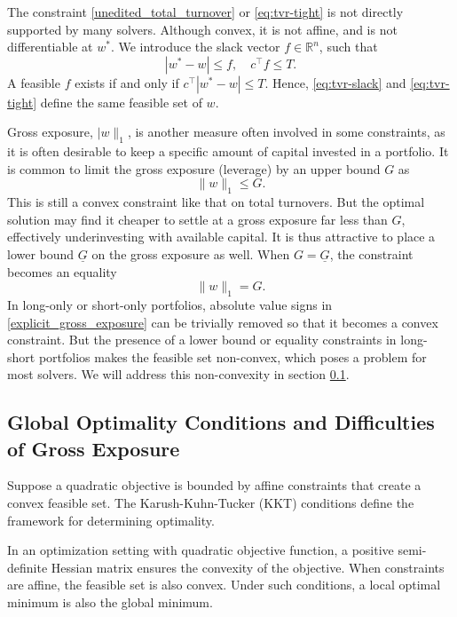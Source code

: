 \documentclass[11pt, letterpaper]{article}
\begin{document}
The constraint \eqref{unedited_total_turnover} or \eqref{eq:tvr-tight} is not directly supported by many solvers. Although
convex, it is not affine, and is not differentiable at $w^*$. We introduce the slack vector $f \in \mathds{R}^n$, such that
\begin{equation}\label{eq:tvr-slack}
	|w^* - w| \leq f, \quad c^\top f \leq T.
\end{equation}
A feasible $f$ exists if and only if $c^\top |w^* - w| \leq T$. Hence, \eqref{eq:tvr-slack} and \eqref{eq:tvr-tight} define the
same feasible set of $w$.

Gross exposure, $\lvert w\rVert_1$, is another measure often involved in some constraints, as it is often desirable to keep a
specific amount of capital invested in a portfolio. It is common to limit the gross exposure (leverage) by an upper bound $G$ as
\begin{equation}\label{eq:exposure-ineq}
	\lVert w\rVert_1 \leq G.
\end{equation}
This is still a convex constraint like that on total turnovers. But the optimal solution may find it cheaper to settle at a
gross exposure far less than $G$, effectively underinvesting with available capital. It is thus attractive to place a lower
bound $\underline{G}$ on the gross exposure as well. When $G=\underline{G}$, the constraint becomes an equality
\begin{equation}
    \label{explicit_gross_exposure}
	\lVert w\rVert_1 = G.
\end{equation}
In long-only or short-only portfolios, absolute value signs in \eqref{explicit_gross_exposure} can be trivially removed so that
it becomes a convex constraint. But the presence of a lower bound or equality constraints in long-short portfolios makes the
feasible set non-convex, which poses a problem for most solvers. We will address this non-convexity in section
\ref{gross_exposure_section}.

\subsection{Global Optimality Conditions and Difficulties of Gross Exposure}
\label{gross_exposure_section}
Suppose a quadratic objective is bounded by affine constraints that create a convex feasible set. The Karush-Kuhn-Tucker (KKT)
conditions \cite{boyd2004KKT} define the framework for determining optimality.

In an optimization setting with quadratic objective function, a positive semi-definite Hessian matrix ensures the convexity of
the objective. When constraints are affine, the feasible set is also convex. Under such conditions, a local optimal minimum is
also the global minimum.
\end{document}
